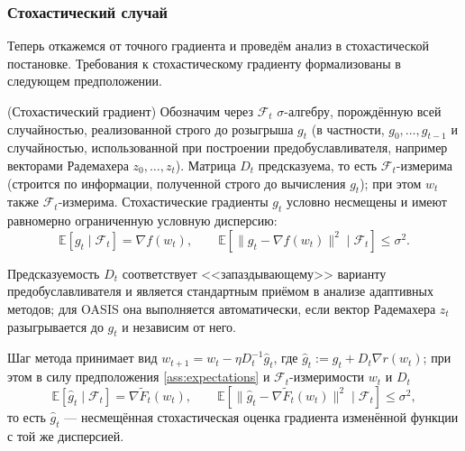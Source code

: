 \subsubsection{Стохастический случай}

Теперь откажемся от точного градиента и проведём анализ в стохастической постановке. Требования к стохастическому градиенту формализованы в следующем предположении.

\begin{assumption}{(Стохастический градиент)}
\label{ass:expectations}
Обозначим через $\mathcal{F}_t$ $\sigma$-алгебру, порождённую всей случайностью, реализованной строго до розыгрыша $g_t$ (в частности, $g_0, \ldots, g_{t-1}$ и случайностью, использованной при построении предобуславливателя, например векторами Радемахера $z_0, \ldots, z_t$). Матрица $D_t$ предсказуема, то есть $\mathcal{F}_t$-измерима (строится по информации, полученной строго до вычисления $g_t$); при этом $w_t$ также $\mathcal{F}_t$-измерима. Стохастические градиенты $g_t$ условно несмещены и имеют равномерно ограниченную условную дисперсию:
\begin{equation*}
\mathbb{E}\left[ g_t \mid \mathcal{F}_t \right] = \nabla f (w_t), \qquad \mathbb{E}\left[ \|g_t - \nabla f(w_t)\|^2 \mid \mathcal{F}_t \right] \leq \sigma^2.
\end{equation*}
\end{assumption}

\begin{note}
Предсказуемость $D_t$ соответствует <<запаздывающему>> варианту предобуславливателя и является стандартным приёмом в анализе адаптивных методов; для OASIS она выполняется автоматически, если вектор Радемахера $z_t$ разыгрывается до $g_t$ и независим от него.
\end{note}

Шаг метода принимает вид $w_{t+1} = w_t - \eta D_t^{-1} \widehat{g}_t$, где $\widehat{g}_t := g_t + D_t \nabla r(w_t)$; при этом в силу предположения \ref{ass:expectations} и $\mathcal{F}_t$-измеримости $w_t$ и $D_t$
$$\mathbb{E}[\widehat{g}_t \mid \mathcal{F}_t] = \nabla \widetilde{F}_t(w_t), \qquad \mathbb{E}\left[\|\widehat{g}_t - \nabla \widetilde{F}_t(w_t)\|^2 \mid \mathcal{F}_t\right] \le \sigma^2,$$
то есть $\widehat{g}_t$ --- несмещённая стохастическая оценка градиента изменённой функции с той же дисперсией.

